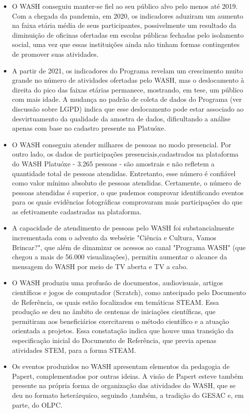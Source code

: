 \begin{itemize}
\item O WASH conseguiu manter-se fiel ao seu público alvo pelo menos até 2019. Com a chegada da pandemia, em 2020, os indicadores  aduziram um aumento na faixa etária média de seus participantes, possivelmente um resultado da diminuição de oficinas ofertadas em escolas públicas fechadas pelo isolamento social, uma vez que essas instituições ainda não tinham formas contingentes de promover suas atividades.
\item A partir de 2021, os indicadores do Programa revelam um crescimento muito grande no número de atividades ofertadas pelo WASH, mas o deslocamento à direita do pico das faixas etárias permanece, mostrando, em tese, um público com mais idade. A mudança no padrão de coleta de dados do Programa (ver discussão sobre LGPD) indica que esse deslocamento pode estar associado ao desvirtuamento da qualidade da amostra de dados, dificultando a análise apenas com base no cadastro presente na Platuóxe.
\item O WASH conseguiu atender milhares de pessoas no modo presencial. Por outro lado, os dados de participações presenciais,cadastrados na plataforma do WASH Platuóxe - 3.265 pessoas - são amostrais e não refletem a quantidade total de pessoas atendidas. Entretanto, esse número é confiável como valor mínimo absoluto de pessoas atendidas. Certamente, o número de pessoas atendidas é  superior, o que pudemos comprovar identificando eventos para os quais evidências fotográficas comprovaram mais participações do que as efetivamente cadastradas na plataforma.
\item A capacidade de atendimento de pessoas pelo WASH foi substancialmente incrementada com o advento da websérie "Ciência e Cultura, Vamos Brincar?", que além de dinamizar os acessos ao canal "Programa WASH" (que chegou a mais de 56.000 visualizações), permitiu  aumentar o alcance da mensagem do WASH por meio de TV aberta e TV a cabo.
\item O WASH produziu uma profusão de documentos, audiovisuais, artigos científicos e jogos de computador (Scratch), como antecipado pelo Documento de Referência, os quais estão focalizados em temáticas STEAM. Essa produção se deu no âmbito de centenas de iniciações científicas, que permitiram aos beneficiários exercitarem o método científico e a atuação orientada a projetos. Essa constatação indica que houve uma transição da especificação inicial do Documento de Referência, que previa apenas atividades STEM, para a forma STEAM.
\item Os eventos produzidos no WASH apresentam elementos da pedagogia de Papert, complementados por outras ideias. A visão de Papert esteve também presente na própria forma de organização das atividades do WASH, que se deu no formato heterárquico, seguindo ,também, a tradição do GESAC e, em parte, do OLPC.

\end{itemize}
